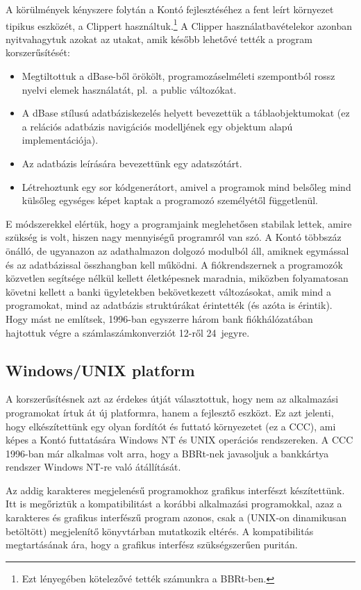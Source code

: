 A körülmények kényszere folytán a Kontó fejlesztéséhez a fent leírt
környezet tipikus eszközét, a Clippert használtuk.\footnote{Ezt lényegében
kötelezővé tették számunkra a BBRt-ben.} A Clipper használatbavételekor
azonban nyitvahagytuk azokat az utakat, amik később lehetővé tették 
a program korszerűsítését:
\begin{itemize}
\item 
  Megtiltottuk a dBase-ből örökölt, programozáselméleti szempontból 
  rossz nyelvi elemek használatát, pl.\ a public változókat.
\item 
  A dBase stílusú adatbáziskezelés helyett bevezettük a táblaobjektumokat
  (ez a relációs adatbázis navigációs modelljének egy objektum alapú
  implementációja).
\item
  Az adatbázis leírására bevezettünk egy adatszótárt.
\item
  Létrehoztunk egy sor kódgenerátort, amivel a programok mind belsőleg
  mind külsőleg egységes képet kaptak a programozó személyétől függetlenül.
\end{itemize}
E módszerekkel elértük, hogy a programjaink meglehetősen stabilak lettek,
amire szükség is volt, hiszen nagy mennyiségű programról van szó.
A Kontó többszáz önálló, de ugyanazon az adathalmazon dolgozó modulból áll, 
amiknek egymással és az adatbázissal összhangban kell működni. 
A fiókrendszernek a programozók közvetlen segítsége nélkül kellett 
életképesnek maradnia, miközben folyamatosan követni kellett a banki 
ügyletekben bekövetkezett változásokat, amik mind a programokat, 
mind az adatbázis struktúrákat érintették (és azóta is érintik).  
Hogy mást ne említsek, 1996-ban egyszerre három bank fiókhálózatában 
hajtottuk végre a számlaszámkonverziót 12-ről 24~jegyre.

\subsection{Windows/UNIX platform}

A korszerűsítésnek azt az érdekes útját választottuk, 
hogy nem az alkalmazási programokat írtuk át új platformra,
hanem a fejlesztő eszközt. Ez azt jelenti, hogy elkészítettünk
egy olyan  fordítót és futtató környezetet (ez a CCC), 
ami képes a Kontó futtatására Windows NT és UNIX operációs rendszereken.
A CCC 1996-ban már alkalmas volt arra, hogy a BBRt-nek javasoljuk
a bankkártya rendszer Windows NT-re való átállítását. 

Az addig karakteres megjelenésű programokhoz grafikus interfészt
készítettünk. Itt is megőriztük a kompatibilitást a korábbi alkalmazási 
programokkal, azaz a karakteres és grafikus interfészű program
azonos, csak a (UNIX-on dinamikusan betöltött) megjelenítő
könyvtárban mutatkozik eltérés. A kompatibilitás megtartásának ára, 
hogy a grafikus interfész szükségszerűen puritán. 

